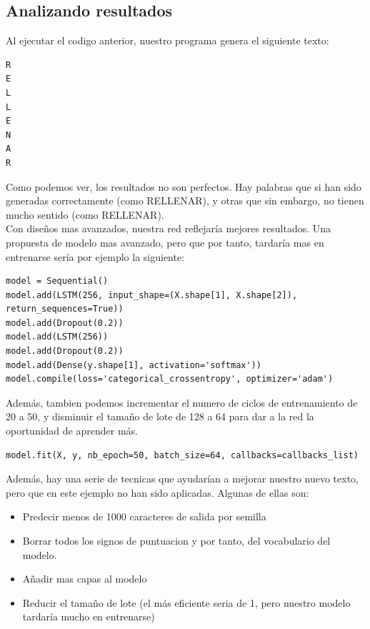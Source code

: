 \subsection{Analizando resultados}
Al ejecutar el codigo anterior, nuestro programa genera el siguiente texto:
\begin{verbatim}
R
E
L
L
E
N
A
R
\end{verbatim}
Como podemos ver, los resultados no son perfectos. Hay palabras que si han sido generadas correctamente (como RELLENAR), y otras que sin embargo, no tienen mucho sentido (como RELLENAR).\\
Con diseños mas avanzados, nuestra red reflejaría mejores resultados. Una propuesta de modelo mas avanzado, pero que por tanto, tardaría mas en entrenarse sería por ejemplo la siguiente:
\begin{verbatim}
model = Sequential()
model.add(LSTM(256, input_shape=(X.shape[1], X.shape[2]), return_sequences=True))
model.add(Dropout(0.2))
model.add(LSTM(256))
model.add(Dropout(0.2))
model.add(Dense(y.shape[1], activation='softmax'))
model.compile(loss='categorical_crossentropy', optimizer='adam')
\end{verbatim}
Además, tambien podemos incrementar el numero de ciclos de entrenamiento de 20 a 50, y disminuir el tamaño de lote de 128 a 64 para dar a la red la oportunidad de aprender más.
\begin{verbatim}
model.fit(X, y, nb_epoch=50, batch_size=64, callbacks=callbacks_list)
\end{verbatim}
Además, hay una serie de tecnicas que ayudarían a mejorar nuestro nuevo texto, pero que en este ejemplo no han sido aplicadas. Algunas de ellas son:
\begin{itemize}
\item Predecir menos de 1000 caracteres de salida por semilla
\item Borrar todos los signos de puntuacion y por tanto, del vocabulario del modelo.
\item Añadir mas capas al modelo
\item Reducir el tamaño de lote (el más eficiente seria de 1, pero nuestro modelo tardaría mucho en entrenarse)
\end{itemize}